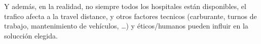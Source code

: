 Y además, en la realidad, no siempre todos los hospitales están disponibles, el trafico afecta a la travel distance, y otros factores tecnicos (carburante, turnos de trabajo, mantenimiento de vehículos, \dots) y éticos/humanos pueden influir en la solucción elegida.

